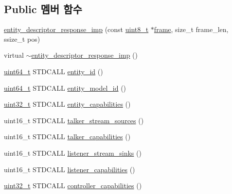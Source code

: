 \subsection*{Public 멤버 함수}
\begin{DoxyCompactItemize}
\item 
\hyperlink{classavdecc__lib_1_1entity__descriptor__response__imp_ad68f2e0482899a16578a004c39e4a5cf}{entity\+\_\+descriptor\+\_\+response\+\_\+imp} (const \hyperlink{stdint_8h_aba7bc1797add20fe3efdf37ced1182c5}{uint8\+\_\+t} $\ast$\hyperlink{gst__avb__playbin_8c_ac8e710e0b5e994c0545d75d69868c6f0}{frame}, size\+\_\+t frame\+\_\+len, ssize\+\_\+t pos)
\item 
virtual \hyperlink{classavdecc__lib_1_1entity__descriptor__response__imp_a7ee923bb672aa26168b416273850a5a5}{$\sim$entity\+\_\+descriptor\+\_\+response\+\_\+imp} ()
\item 
\hyperlink{parse_8c_aec6fcb673ff035718c238c8c9d544c47}{uint64\+\_\+t} S\+T\+D\+C\+A\+LL \hyperlink{classavdecc__lib_1_1entity__descriptor__response__imp_a363b6c9664a0d701def9b17863e20ad3}{entity\+\_\+id} ()
\item 
\hyperlink{parse_8c_aec6fcb673ff035718c238c8c9d544c47}{uint64\+\_\+t} S\+T\+D\+C\+A\+LL \hyperlink{classavdecc__lib_1_1entity__descriptor__response__imp_ac60929eaf596bf8d87f0726ec2e9b38a}{entity\+\_\+model\+\_\+id} ()
\item 
\hyperlink{parse_8c_a6eb1e68cc391dd753bc8ce896dbb8315}{uint32\+\_\+t} S\+T\+D\+C\+A\+LL \hyperlink{classavdecc__lib_1_1entity__descriptor__response__imp_a1a523c8eab1e3d57d7830e7d87d27a1b}{entity\+\_\+capabilities} ()
\item 
uint16\+\_\+t S\+T\+D\+C\+A\+LL \hyperlink{classavdecc__lib_1_1entity__descriptor__response__imp_acaa66e620cce53279ebe60931312301f}{talker\+\_\+stream\+\_\+sources} ()
\item 
uint16\+\_\+t S\+T\+D\+C\+A\+LL \hyperlink{classavdecc__lib_1_1entity__descriptor__response__imp_a47f811ccc1c21dd619f587b7dee37eee}{talker\+\_\+capabilities} ()
\item 
uint16\+\_\+t S\+T\+D\+C\+A\+LL \hyperlink{classavdecc__lib_1_1entity__descriptor__response__imp_ac86e365e9b1c72880ba10fd2a175dd69}{listener\+\_\+stream\+\_\+sinks} ()
\item 
uint16\+\_\+t S\+T\+D\+C\+A\+LL \hyperlink{classavdecc__lib_1_1entity__descriptor__response__imp_ac9b23d2aa16e2de121cdc85f1599ee51}{listener\+\_\+capabilities} ()
\item 
\hyperlink{parse_8c_a6eb1e68cc391dd753bc8ce896dbb8315}{uint32\+\_\+t} S\+T\+D\+C\+A\+LL \hyperlink{classavdecc__lib_1_1entity__descriptor__response__imp_a83e13d2230923f2a688317fc52657245}{controller\+\_\+capabilities} ()

\end{DoxyCompactItemize}
